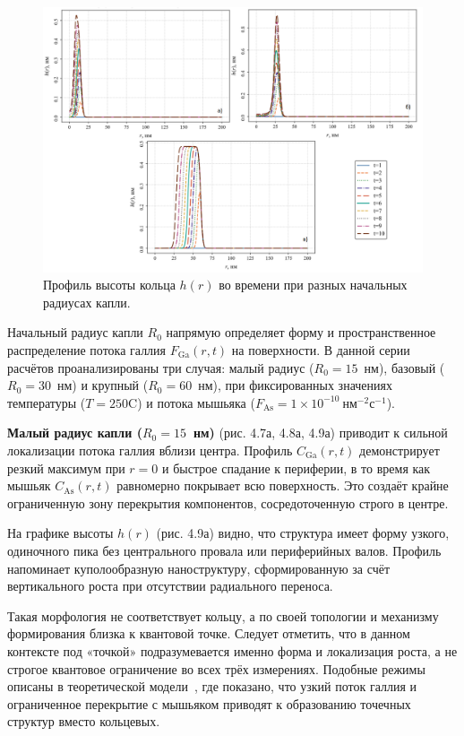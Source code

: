 \documentclass[14pt,oneside]{extarticle}
\begin{document}
\begin{figure}
    \begin{center}
    \includegraphics[width=18cm]{images/h_t_3.png}
    \caption{\label{fig:rd_h} Профиль высоты кольца $h(r)$ во времени при разных начальных радиусах капли.}
    \end{center}
\end{figure}

Начальный радиус капли $R_0$ напрямую определяет форму и пространственное распределение потока галлия $F_\mathrm{Ga}(r, t)$ на поверхности. В данной серии расчётов проанализированы три случая: малый радиус ($R_0 = 15$~нм), базовый ($R_0 = 30$~нм) и крупный ($R_0 = 60$~нм), при фиксированных значениях температуры ($T = 250$\textdegree C) и потока мышьяка ($F_\mathrm{As} = 1 \times 10^{-10}~\text{нм}^{-2}\text{с}^{-1}$).

\textbf{Малый радиус капли ($R_0 = 15$~нм)} (рис. 4.7а, 4.8а, 4.9а) приводит к сильной локализации потока галлия вблизи центра. Профиль $C_\mathrm{Ga}(r, t)$ демонстрирует резкий максимум при $r = 0$ и быстрое спадание к периферии, в то время как мышьяк $C_\mathrm{As}(r, t)$ равномерно покрывает всю поверхность. Это создаёт крайне ограниченную зону перекрытия компонентов, сосредоточенную строго в центре.

На графике высоты $h(r)$ (рис. 4.9а) видно, что структура имеет форму узкого, одиночного пика без центрального провала или периферийных валов. Профиль напоминает куполообразную наноструктуру, сформированную за счёт вертикального роста при отсутствии радиального переноса.

Такая морфология не соответствует кольцу, а по своей топологии и механизму формирования близка к квантовой точке. Следует отметить, что в данном контексте под «точкой» подразумевается именно форма и локализация роста, а не строгое квантовое ограничение во всех трёх измерениях. Подобные режимы описаны в теоретической модели~\cite{zhou2013}, где показано, что узкий поток галлия и ограниченное перекрытие с мышьяком приводят к образованию точечных структур вместо кольцевых.
\end{document}
